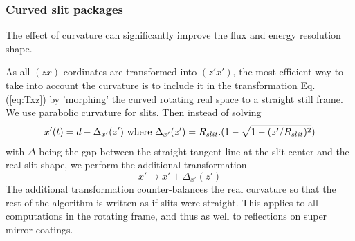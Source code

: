 \subsubsection{Curved slit packages}

The effect of curvature can significantly improve the flux and energy resolution shape.

As all $(zx)$ cordinates are transformed into $(z'x')$, the most efficient way to take into account the curvature is to include it in the transformation Eq. (\ref{eq:Txz}) by 'morphing' the curved rotating real space to a straight still frame. We use parabolic curvature for slits. Then instead of solving
\begin{equation}x'(t) = d - \Delta_{x'}(z') {\rm\ where\ } \Delta_{x'}(z')=R_{slit}.(1-\sqrt{1-(z'/R_{slit})^2})
\end{equation}
with $\Delta$ being the gap between the straight tangent line at the slit center and the real slit shape, we perform the additional transformation
\begin{equation}
x' \rightarrow x' + \Delta_{x'}(z')
\end{equation}
The additional transformation counter-balances the real curvature so that the rest of the algorithm is written as if slits were straight.
This applies to all computations in the rotating frame, and thus as well to reflections on super mirror coatings.

